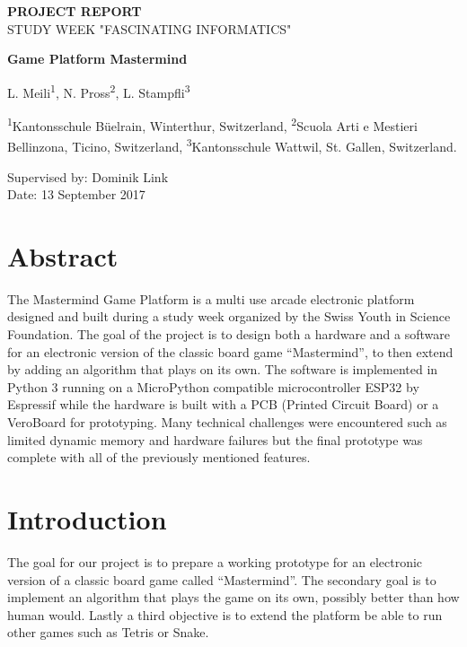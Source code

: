 \documentclass[a4paper, 12pt]{article}
\begin{document}
\begin{center}
\begin{minipage}{\textwidth}
\setlength{\parindent}{0pt}
{\Large
    \textbf{PROJECT REPORT} \vspace{8pt} \\
    STUDY WEEK "FASCINATING INFORMATICS"
}

\vspace{1em}
\textbf{\Large Game Platform Mastermind}
\vspace{1em}

L. Meili\textsuperscript{1}, %
N. Pross\textsuperscript{2}, %
L. Stampfli\textsuperscript{3}

\vspace{1em}
\textsuperscript{1}Kantonsschule Büelrain, Winterthur, Switzerland,
\textsuperscript{2}Scuola Arti e Mestieri Bellinzona, Ticino, Switzerland,
\textsuperscript{3}Kantonsschule Wattwil, St. Gallen, Switzerland.
\vspace{1em}

Supervised by: Dominik Link \\
Date: 13 September 2017
\end{minipage}
\end{center}


\section*{Abstract}
The Mastermind Game Platform is a multi use arcade electronic platform
designed and built during a study week organized by  the Swiss Youth in
Science Foundation. The goal of the project is to design both a hardware
and a software for an electronic version of the classic board game
“Mastermind”, to then extend by adding an algorithm that plays on its
own. The software is implemented in Python 3 running on a MicroPython
compatible microcontroller ESP32 by Espressif while the hardware is
built with a PCB (Printed Circuit Board) or a VeroBoard for prototyping.
Many technical challenges were encountered such as limited dynamic
memory and hardware failures but the final prototype was complete with
all of  the previously mentioned features.

\section{Introduction}
The goal for our project is to prepare a working prototype for an
electronic version of a classic board game called “Mastermind”. The
secondary goal is to implement an algorithm that plays the game on its
own, possibly better than how human would. Lastly a third objective is
to extend the platform be able to run other games such as Tetris or
Snake.
\end{document}
